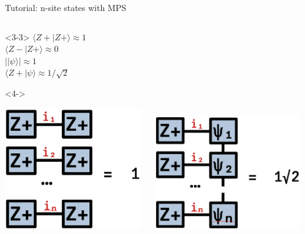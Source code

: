 \begin{frame}[fragile]{Tutorial: n-site states with MPS}
\begin{columns}
\begin{column}{5.5cm}
\begin{onlyenv}<3-3>
$\langle Z+|Z+\rangle \approx 1$ \\
$\langle Z-|Z+\rangle \approx 0$ \\
$||\psi\rangle| \approx 1$ \\
$\langle Z+|\psi\rangle \approx 1/\sqrt{2}$ \\
\end{onlyenv}

\begin{onlyenv}<4->
\vspace*{0.0cm}
\begin{center}
\includegraphics[width=0.44\textwidth]{
  slides/assets/Zpn_Zpn.png
} \ \ %
\includegraphics[width=0.47\textwidth]{
  slides/assets/Zpn_catn.png
}
\end{center}
\vspace*{0.0cm}
\end{onlyenv}

\end{column}

\end{columns}

\end{frame}
